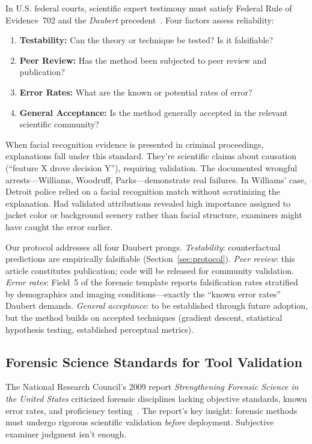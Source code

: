 In U.S. federal courts, scientific expert testimony must satisfy Federal Rule of Evidence~702 and the \textit{Daubert} precedent~\cite{daubert1993}. Four factors assess reliability:

\begin{enumerate}
\item \textbf{Testability:} Can the theory or technique be tested? Is it falsifiable?
\item \textbf{Peer Review:} Has the method been subjected to peer review and publication?
\item \textbf{Error Rates:} What are the known or potential rates of error?
\item \textbf{General Acceptance:} Is the method generally accepted in the relevant scientific community?
\end{enumerate}

When facial recognition evidence is presented in criminal proceedings, explanations fall under this standard. They're scientific claims about causation (``feature X drove decision Y''), requiring validation. The documented wrongful arrests—Williams, Woodruff, Parks—demonstrate real failures. In Williams' case, Detroit police relied on a facial recognition match without scrutinizing the explanation. Had validated attributions revealed high importance assigned to jacket color or background scenery rather than facial structure, examiners might have caught the error earlier.

Our protocol addresses all four Daubert prongs. \textit{Testability}: counterfactual predictions are empirically falsifiable (Section~\ref{sec:protocol}). \textit{Peer review}: this article constitutes publication; code will be released for community validation. \textit{Error rates}: Field~5 of the forensic template reports falsification rates stratified by demographics and imaging conditions—exactly the ``known error rates'' Daubert demands. \textit{General acceptance}: to be established through future adoption, but the method builds on accepted techniques (gradient descent, statistical hypothesis testing, established perceptual metrics).

\subsection{Forensic Science Standards for Tool Validation}

The National Research Council's 2009 report \textit{Strengthening Forensic Science in the United States} criticized forensic disciplines lacking objective standards, known error rates, and proficiency testing~\cite{nrc2009forensics}. The report's key insight: forensic methods must undergo rigorous scientific validation \textit{before} deployment. Subjective examiner judgment isn't enough.

